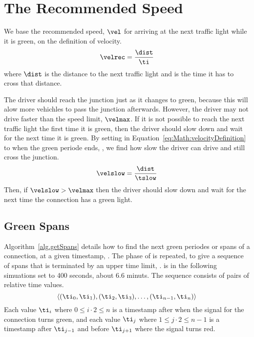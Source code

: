 \section{The Recommended Speed}\label{sec:Math}

We base the recommended speed, $\vel$ for arriving at the next traffic light while it is green, on the definition of velocity.
\begin{eqnarray}
\velrec = \frac{\dist}{\ti}\label{eq:Math:velocityDefinition}
\end{eqnarray}
where $\dist$ is the distance to the next traffic light and \ti is the time it has to cross that distance.

The driver should reach the junction just as it changes to green, because this will alow more vehichles to pass the junction afterwards.
However, the driver may not drive faster than the speed limit, $\velmax$.
If it is not possible to reach the next traffic light the first time it is green, then the driver should slow down and wait for the next time it is green.
By setting \ti in Equation~\ref{eq:Math:velocityDefinition} to when the green periode ends, \tslow, we find how slow the driver can drive and still cross the junction.
\begin{eqnarray}
\velslow = \frac{\dist}{\tslow}\label{eq:Math:velocitySlow}
\end{eqnarray}
Then, if $\velslow > \velmax$ then the driver should slow down and wait for the next time the connection has a green light.

\subsection{Green Spans}\label{sec:greenSpans}
Algorithm~\ref{alg.getSpans} details how to find the next green periodes or spans of a connection, \con at a given timestamp, \ti. 
The phase of \con is repeated, to give a sequence of spans that is terminated by an upper time limit, \tmax.
\tmax is in the following simuations set to 400 seconds, about $6.6$ minuts. %
The sequence consists of pairs of relative time values.
\[\langle(\ti_0, \ti_1), (\ti_2, \ti_3), \dots, (\ti_{n-1}, \ti_n)\rangle\]
Each value $\ti_i$ where $0\leq i\cdot 2\leq n$ is a timestamp after \ti when the signal for the connection turns green, and each value $\ti_j$ where $1\leq j\cdot 2\leq n-1$ is a timestamp after $\ti_{j-1}$ and before $\ti_{j+1}$ where the signal turns red.

